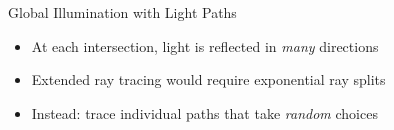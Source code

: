 \documentclass[utf8,stillsansserifmath,fleqn,t]{beamer}
\begin{document}
\begin{frame}[label=idea-global-light-paths]
\frametitle{\insertsection}
Global Illumination with Light Paths
\begin{itemize}
\item<1-> At each intersection, light is reflected in \emph{many} directions
\item<2-> Extended ray tracing would require exponential ray splits
\item<3-> Instead: trace individual paths that take \emph{random} choices
\end{itemize}
\vfill
{}

\end{frame}
\end{document}

